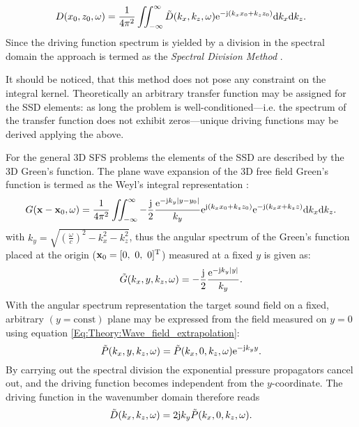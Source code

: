 \begin{equation}
D(x_0,z_0,\omega) = \frac{1}{4\pi^2} \iint_{-\infty}^{\infty} \tilde{D}(k_x,k_z, \omega) \mathrm{e}^{-\mathrm{j} (k_x x_0 + k_z z_0)} \mathrm{d} k_x \mathrm{d} k_z.
\label{Eq:Theory:Dkx_inverse_Fourier}
\end{equation}
Since the driving function spectrum is yielded by a division in the spectral domain the approach is termed as the \emph{Spectral Division Method} \cite{Ahrens2010a, Ahrens2012:Ambisonics_for_planar_linear, Ahrens2011:icassp, Ahrens2010:Ambisonics_w_planar_linear}.

It should be noticed, that this method does not pose any constraint on the integral kernel. Theoretically an arbitrary transfer function may be assigned for the SSD elements: as long the problem is well-conditioned---i.e. the spectrum of the transfer function does not exhibit zeros---unique driving functions may be derived applying the above.

\vspace{3mm}
For the general 3D SFS problems the elements of the SSD are described by the 3D Green's function. The plane wave expansion of the 3D free field Green's function is termed as the Weyl's integral representation \cite{Williams1999, Lalor1969}:
\begin{equation}
G(\mathbf{x} - \mathbf{x}_0,\omega ) = \frac{1}{4\pi^2} \iint_{-\infty}^{\infty} -\frac{\mathrm{j}}{2}\frac{\mathrm{e}^{ -\mathrm{j} k_y  | y - y_0 |  }}{ k_y }
\mathrm{e}^{\mathrm{j} (k_x x_0 + k_z z_0)} \mathrm{e}^{-\mathrm{j} (k_x x + k_z z)} \mathrm{d} k_x \mathrm{d} k_z.
\label{Eq:Theory:Weyls_integral}
\end{equation}
with $k_y = \sqrt{ \left( \frac{\omega}{c} \right )^2 - k_x^2 - k_z^2 }$, thus the angular spectrum of the Green's function placed at the origin ($\mathbf{x}_0 = [0,\ 0,\ 0]^{\mathrm{T}}$) measured at a fixed $y$ is given as:
\begin{equation}
\tilde{G}(k_x,y,k_z,\omega) =-\frac{\mathrm{j}}{2}\frac{\mathrm{e}^{ -\mathrm{j} k_y  | y |  }}{ k_y }.
\end{equation}
With the angular spectrum representation the target sound field on a fixed, arbitrary $(y=\mathrm{const})$ plane may be expressed from the field measured on $y=0$ using equation \eqref{Eq:Theory:Wave_field_extrapolation}:
\begin{equation}
\tilde{P}(k_x,y,k_z,\omega) = \tilde{P}(k_x,0,k_z,\omega) \mathrm{e}^{- \mathrm{j} k_y y}.
\label{Eq:Theory:Wave_field_extrapolation_2}
\end{equation}
By carrying out the spectral division the exponential pressure propagators cancel out, and the driving function becomes independent from the $y$-coordinate. The driving function in the wavenumber domain therefore reads
\begin{equation}
\tilde{D}(k_x,k_z,\omega) = 2\mathrm{j} k_y \tilde{P}(k_x,0,k_z,\omega).
\label{Eq:Theory:Planar_explicit_driv_fun}
\end{equation}

